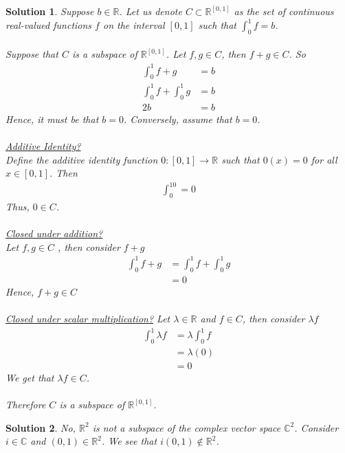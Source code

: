 \documentclass[12pt]{article}
\newcommand{\C}{\mathbb{C}}
\newcommand{\R}{\mathbb{R}}
\theoremstyle{problem}
\newtheorem{sol}{Solution}
\theoremstyle{remark}
\begin{document}
\begin{sol}
Suppose $b \in \R$. Let us denote $C \subset \R^{\left[0,1\right]}$ as the set of continuous real-valued functions $f$ on the interval $\left[0,1\right]$ such that $\int_{0}^{1} f  = b$. 
\\ \\
Suppose that $C$ is a subspace of $\R^{\left[0,1\right]}$. Let $f,g \in C$, then $f + g \in C$. So 
\begin{align*}
    \int_{0}^{1} f + g &= b \\
    \int_{0}^{1} f  + \int_{0}^{1} g  &= b \\
    2b &= b
\end{align*}
Hence, it must be that $b = 0$. Conversely, assume that $b = 0$.  \\ \\
\textit{\underline{Additive Identity?}} \\
Define the additive identity function $0: \left[0,1\right] \to \R$ such that $0(x) = 0$ for all $x \in \left[0,1\right]$. Then
\begin{align*}
    \int_{0}^10 = 0
\end{align*}
Thus, $0 \in C$.  \\ \\
\textit{\underline{Closed under addition?}} \\
Let $f,g \in C$ , then consider $f + g$
\begin{align*}
   \int_{0} ^{1} f + g &= \int_{0}^{1} f + \int_{0}^{1}g \\
   &= 0
\end{align*}
Hence, $f + g \in C$ \\ \\
\textit{\underline{Closed under scalar multiplication?}}
Let $\lambda \in \R$ and $f \in C$, then consider $\lambda f$
\begin{align*}
    \int_{0}^{1} \lambda f &= \lambda\int_{0}^{1}f \\
    &=\lambda(0)  \\
    &= 0
\end{align*}
We get that $\lambda f \in C$. \\ \\
Therefore $C$ is a subspace of $\R^{\left[0,1\right]}$. 
\end{sol}
\begin{sol}
    No, $\R^2$ is not a subspace of the complex vector space $\C^2$. Consider $i \in \C$ and $(0,1) \in \R^2$. We see that $i(0,1) \not \in \R^2$.
\end{sol}
\end{document}
